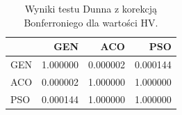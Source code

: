 \begin{table}
\caption{Wyniki testu Dunna z korekcją Bonferroniego dla wartości HV.}
\label{tab:dunn_global}
\begin{tabular}{lrrr}
\toprule
 & GEN & ACO & PSO \\
\midrule
GEN & 1.000000 & 0.000002 & 0.000144 \\
ACO & 0.000002 & 1.000000 & 1.000000 \\
PSO & 0.000144 & 1.000000 & 1.000000 \\
\bottomrule
\end{tabular}
\end{table}
